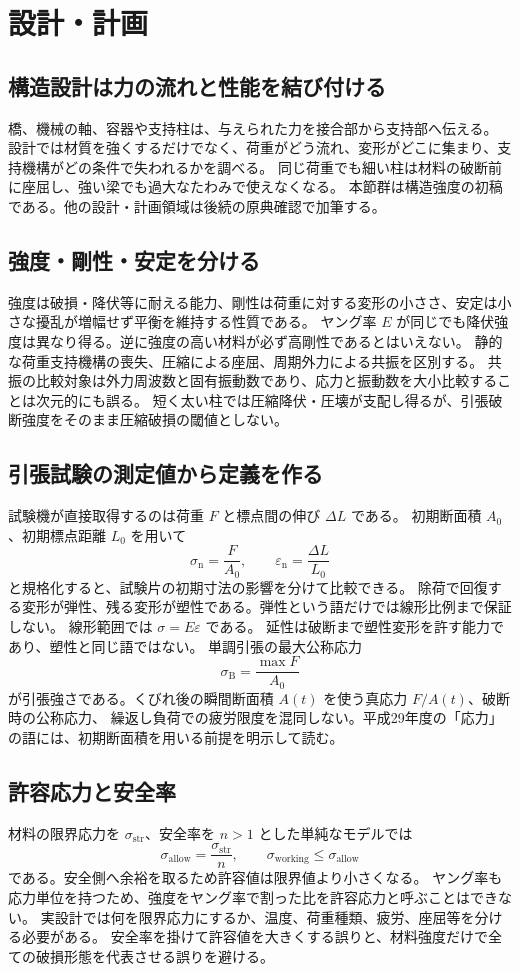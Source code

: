\chapter{設計・計画}
\section{構造設計は力の流れと性能を結び付ける}
橋、機械の軸、容器や支持柱は、与えられた力を接合部から支持部へ伝える。
設計では材質を強くするだけでなく、荷重がどう流れ、変形がどこに集まり、支持機構がどの条件で失われるかを調べる。
同じ荷重でも細い柱は材料の破断前に座屈し、強い梁でも過大なたわみで使えなくなる。
本節群は構造強度の初稿である。他の設計・計画領域は後続の原典確認で加筆する。

\section{強度・剛性・安定を分ける}
\label{theory:structural:modes}
強度は破損・降伏等に耐える能力、剛性は荷重に対する変形の小ささ、安定は小さな擾乱が増幅せず平衡を維持する性質である。
ヤング率 \(E\) が同じでも降伏強度は異なり得る。逆に強度の高い材料が必ず高剛性であるとはいえない。
静的な荷重支持機構の喪失、圧縮による座屈、周期外力による共振を区別する。
共振の比較対象は外力周波数と固有振動数であり、応力と振動数を大小比較することは次元的にも誤る。
短く太い柱では圧縮降伏・圧壊が支配し得るが、引張破断強度をそのまま圧縮破損の閾値としない。

\section{引張試験の測定値から定義を作る}
\label{theory:structural:tensile}
試験機が直接取得するのは荷重 \(F\) と標点間の伸び \(\Delta L\) である。
初期断面積 \(A_0\)、初期標点距離 \(L_0\) を用いて
\[
 \sigma_{\mathrm n}=\frac{F}{A_0},\qquad
 \varepsilon_{\mathrm n}=\frac{\Delta L}{L_0}
\]
と規格化すると、試験片の初期寸法の影響を分けて比較できる。
除荷で回復する変形が弾性、残る変形が塑性である。弾性という語だけでは線形比例まで保証しない。
線形範囲では \(\sigma=E\varepsilon\) である\cite{struct_mlit_glossary}。
延性は破断まで塑性変形を許す能力であり、塑性と同じ語ではない。
単調引張の最大公称応力
\[
 \sigma_{\mathrm B}=\frac{\max F}{A_0}
\]
が引張強さである。くびれ後の瞬間断面積 \(A(t)\) を使う真応力 \(F/A(t)\)、破断時の公称応力、
繰返し負荷での疲労限度を混同しない。平成29年度の「応力」の語には、初期断面積を用いる前提を明示して読む。

\section{許容応力と安全率}
\label{theory:structural:allowable}
材料の限界応力を \(\sigma_{\mathrm{str}}\)、安全率を \(n>1\) とした単純なモデルでは
\[
 \sigma_{\mathrm{allow}}=\frac{\sigma_{\mathrm{str}}}{n},
 \qquad \sigma_{\mathrm{working}}\le \sigma_{\mathrm{allow}}
\]
である。安全側へ余裕を取るため許容値は限界値より小さくなる。
ヤング率も応力単位を持つため、強度をヤング率で割った比を許容応力と呼ぶことはできない。
実設計では何を限界応力にするか、温度、荷重種類、疲労、座屈等を分ける必要がある。
安全率を掛けて許容値を大きくする誤りと、材料強度だけで全ての破損形態を代表させる誤りを避ける。

